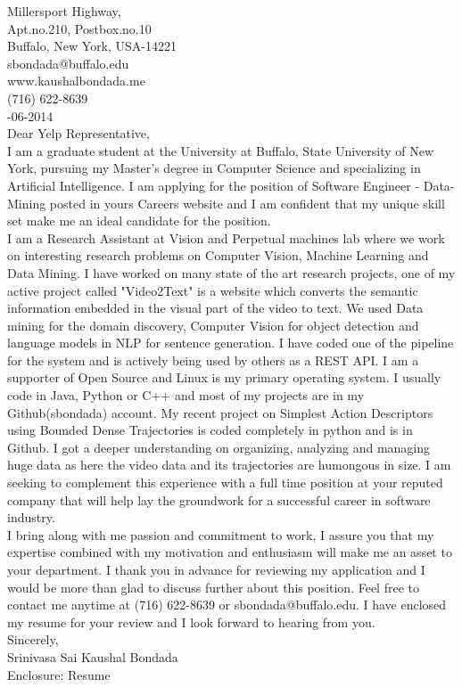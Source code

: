 \documentclass[10pt,letterpaper,oneside]{article}
\begin{document}
 Millersport Highway,\\
Apt.no.210, Postbox.no.10\\
Buffalo, New York, USA-14221\\
sbondada@buffalo.edu\\
www.kaushalbondada.me\\
(716) 622-8639\\

-06-2014\\
 
\noindent Dear Yelp Representative,\\
 
I am a graduate student at the University at Buffalo, State University of New York, pursuing my Master's degree in Computer Science and
specializing in Artificial Intelligence. I am applying for the position of Software Engineer - Data-Mining posted in yours Careers website and I am confident that my unique skill set make me an ideal candidate for the position.\\

I am a Research Assistant at Vision and Perpetual machines lab where we work on interesting research problems on Computer
Vision, Machine Learning and Data Mining. I have worked on many state of the art research projects, one of my active project called 
"Video2Text" is a website which converts the semantic information embedded in the visual part of the video to text. We used Data mining for the
domain discovery, Computer Vision for object detection and language models in NLP for sentence generation. I have coded one of the pipeline
for the system and is actively being used by others as a REST API. I am a supporter of Open Source and Linux is my primary operating
system. I usually code in Java, Python or C++ and most of my projects are in my Github(sbondada) account. My recent project on Simplest Action
Descriptors using Bounded Dense Trajectories is coded completely in python and is in Github. I got a deeper understanding on organizing,
analyzing and managing huge data as here the video data and its trajectories are humongous in size. I am seeking to complement this experience with a full time position at your reputed company that will help lay the groundwork for a successful career in software industry.\\

I bring along with me passion and commitment to work, I assure you that my expertise combined with my motivation and enthusiasm will make me an asset to your department. I thank you in advance for reviewing my application and I would be more than glad to discuss further about this position. Feel free to contact me anytime at (716) 622-8639 or sbondada@buffalo.edu. I have enclosed my resume for your review and I look forward to hearing from you.\\
 
\noindent Sincerely,\\
Srinivasa Sai Kaushal Bondada\\
Enclosure: Resume\\
\end{document}
